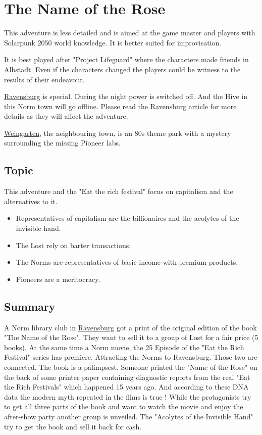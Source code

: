 \chapter{The Name of the Rose}
\label{ch:the name of the rose}

This adventure is less detailed and is aimed at the game master and players with Solarpunk 2050 world knowledge. It is better suited for improvisation.

It is best played after "Project Lifeguard" where the characters made friends in \hyperref[ch:project lifeguard]{Albstadt}. Even if the characters changed the players could be witness to the results of their endeavour.

\hyperref[subsec:Ravensburg]{Ravensburg} is special. During the night power is switched off. And the Hive in this Norm town will go offline. Please read the Ravensburg article for more details as they will affect the adventure.

\hyperref[subsec:Weingarten]{Weingarten}, the neighbouring town, is an 80s theme park with a mystery surrounding the missing Pioneer labs.

\section{Topic}

This adventure and the "Eat the rich festival" focus on capitalism and the alternatives to it.
\begin{itemize}
    \item Representatives of capitalism are the billionaires and the acolytes of the invisible hand.
    \item The Lost rely on barter transactions.
    \item The Norms are representatives of basic income with premium products.
    \item Pioneers are a meritocracy.
\end{itemize}

\section{Summary}

A Norm library club in \hyperref[subsec:Ravensburg]{Ravensburg} got a print of the original edition of the book "The Name of the Rose". They want to sell it to a group of Lost for a fair price (5 books).
At the same time a Norm movie, the 25 Episode of the "Eat the Rich Festival" series has premiere. Attracting the Norms to Ravensburg. Those two are connected.
The book is a palimpsest. Someone printed the "Name of the Rose" on the back of some printer paper containing diagnostic reports from the real "Eat the Rich Festivals" which happened 15 years ago. And according to these DNA data the modern myth repeated in the films is true !
While the protagonists try to get all three parts of the book and want to watch the movie and enjoy the after-show party another group is unveiled. The "Acolytes of the Invisible Hand" try to get the book and sell it back for cash.


